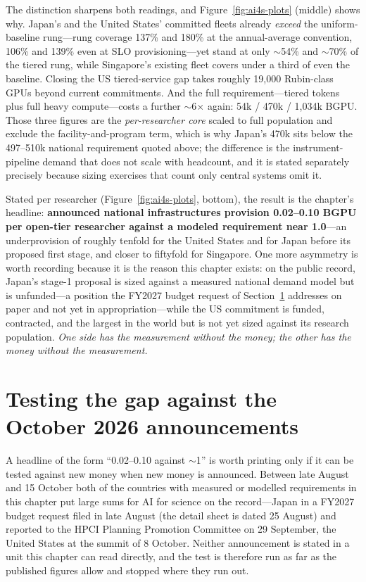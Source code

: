 The distinction sharpens both readings, and Figure~\ref{fig:ai4s-plots} (middle) shows why. Japan's and the United States' committed fleets already \emph{exceed} the uniform-baseline rung---rung coverage 137\% and 180\% at the annual-average convention, 106\% and 139\% even at SLO provisioning---yet stand at only $\sim$54\% and $\sim$70\% of the tiered rung, while Singapore's existing fleet covers under a third of even the baseline. Closing the US tiered-service gap takes roughly 19,000 Rubin-class GPUs beyond current commitments. And the full requirement---tiered tokens plus full heavy compute---costs a further $\sim$6$\times$ again: 54k / 470k / 1,034k BGPU. Those three figures are the \emph{per-researcher core} scaled to full population and exclude the facility-and-program term, which is why Japan's 470k sits below the 497--510k national requirement quoted above; the difference is the instrument-pipeline demand that does not scale with headcount, and it is stated separately precisely because sizing exercises that count only central systems omit it.

Stated per researcher (Figure~\ref{fig:ai4s-plots}, bottom), the result is the chapter's headline: \textbf{announced national infrastructures provision 0.02--0.10 BGPU per open-tier researcher against a modeled requirement near 1.0}---an underprovision of roughly tenfold for the United States and for Japan before its proposed first stage, and closer to fiftyfold for Singapore. One more asymmetry is worth recording because it is the reason this chapter exists: on the public record, Japan's stage-1 proposal is sized against a measured national demand model but is unfunded---a position the FY2027 budget request of Section~\ref{sec:sci-gap-test} addresses on paper and not yet in appropriation---while the US commitment is funded, contracted, and the largest in the world but is not yet sized against its research population. \emph{One side has the measurement without the money; the other has the money without the measurement.}

\section{Testing the gap against the October 2026 announcements}
\label{sec:sci-gap-test}

A headline of the form ``0.02--0.10 against $\sim$1'' is worth printing only if it can be tested against new money when new money is announced. Between late August and 15 October both of the countries with measured or modelled requirements in this chapter put large sums for AI for science on the record---Japan in a FY2027 budget request filed in late August (the detail sheet is dated 25 August) and reported to the HPCI Planning Promotion Committee on 29 September, the United States at the summit of 8 October. Neither announcement is stated in a unit this chapter can read directly, and the test is therefore run as far as the published figures allow and stopped where they run out.

